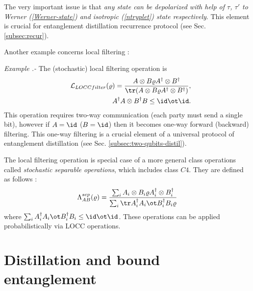 \documentclass[twocolumn,aps,rmp]{revtex4}
\begin{document}
The very important issue is that {\it any state can be depolarized
  with help of $\tau$, $\tau'$ to Werner (\ref{Werner-state}) and
  isotropic (\ref{ntryplet}) state respectively}. This element is
crucial for entanglement distillation recurrence protocol
\cite{BBPSSW1996} (see Sec. \ref{subsec:recur}).

Another example concerns local filtering \cite{BBPS1996,Gisin96}:

{\it Example .-} The (stochastic) local filtering operation is
\begin{eqnarray}
&&{\cal L}_{LOCCfilter}(\varrho)=\frac{A \otimes B \varrho A^\dagger
\otimes B^\dagger }{{\tr}(A \otimes B \varrho A^\dagger \otimes
B^\dagger)}, \nonumber \\
&&A^{\dagger}A \otimes B^{\dagger}B \leq \id\ot\id.
\end{eqnarray}
This operation requires two-way communication (each party must send a
single bit), however if $A=\id$ ($B=\id$) then it becomes one-way
forward (backward) filtering. This one-way filtering is a crucial
element of a universal protocol of entanglement distillation
\cite{HHH1997-distill} (see Sec. \ref{subsec:two-qubits-distil}).

The local filtering operation is special case of a more general class
operations called {\it stochastic separable operations}, which
includes class $C4$. They are defined as follows
\cite{PlenioVedral1998,RainsSep}:
\begin{eqnarray}
\Lambda^{sep}_{AB}(\varrho)={\sum_{i} A_{i} \otimes B_{i} \varrho
A_{i}^{\dagger} \otimes B_{i}^{\dagger} \over \sum_i {\tr} A_i^{\dagger}A_i\ot B_i^{\dagger}B_i\varrho}
\end{eqnarray}
where $\sum_i A_i^{\dagger}A_i\ot B_i^{\dagger}B_i\leq \id\ot\id$.
These operations can be applied probabilistically via LOCC operations.



\section{Distillation and bound entanglement}
\label{sec:distil}
\end{document}
